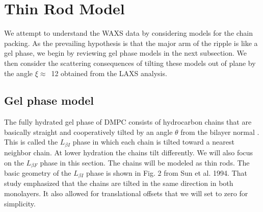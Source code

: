 \newpage
\section{Thin Rod Model}
We attempt to understand the WAXS data by considering models for the chain packing.  As the prevailing hypothesis is that the major arm of the ripple is like a gel phase, we begin by reviewing gel phase models in the next subsection.  We then consider the scattering consequences of tilting these models out of plane by the angle $\xi\approx$~12{\textdegree} obtained from the LAXS analysis.
\subsection{Gel phase model}
The fully hydrated gel phase of DMPC consists of hydrocarbon chains that are 
basically straight and cooperatively tilted by an angle $\theta$ from the 
bilayer normal \cite{ref:Smith88,ref:Tristram93,ref:Sun94,Tristram-Nagle02}. 
This is called the $L_{{\beta}I}$ phase in which each chain is tilted toward 
a nearest neighbor chain. At lower hydration the chains tilt differently. 
We will also focus on the $L_{{\beta}F}$ phase in this section.  The chains 
will be modeled as thin rods.  The basic geometry of the $L_{{\beta}I}$ phase 
is shown in Fig. 2 from Sun et al. 1994.  That study emphasized that the chains 
are tilted in the same direction in both monolayers. It also allowed for 
translational offsets that we will set to zero for simplicity.  

